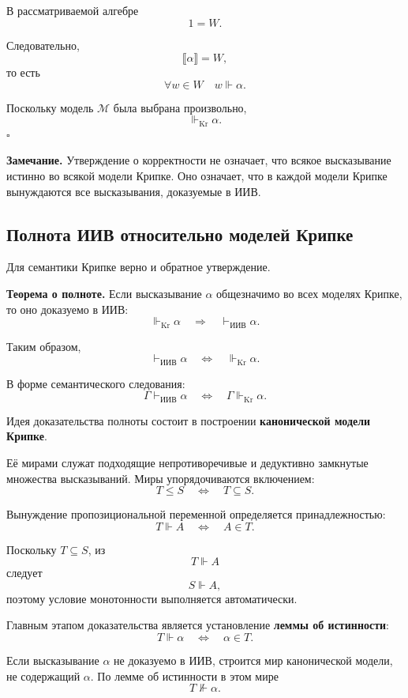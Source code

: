 \documentclass[12pt,a4paper,oneside,openany]{book}
\theoremstyle{definition}
\theoremstyle{plain}
\theoremstyle{remark}
\begin{document}
В рассматриваемой алгебре
\[
1=W.
\]

Следовательно,
\[
\llbracket\alpha\rrbracket=W,
\]
то есть
\[
\forall w\in W
\quad
w\Vdash\alpha.
\]

Поскольку модель \(\mathcal M\) была выбрана произвольно,
\[
\Vdash_{\mathrm{Kr}}\alpha.
\]
\hfill\(\square\)

\textbf{Замечание.}
Утверждение о корректности не означает, что всякое высказывание
истинно во всякой модели Крипке. Оно означает, что в каждой модели
Крипке вынуждаются все высказывания, доказуемые в ИИВ.

\subsection{Полнота ИИВ относительно моделей Крипке}

Для семантики Крипке верно и обратное утверждение.

\textbf{Теорема о полноте.}
Если высказывание \(\alpha\) общезначимо во всех моделях Крипке, то
оно доказуемо в ИИВ:
\[
\Vdash_{\mathrm{Kr}}\alpha
\quad\Longrightarrow\quad
\vdash_{\mathrm{ИИВ}}\alpha.
\]

Таким образом,
\[
\boxed{
\vdash_{\mathrm{ИИВ}}\alpha
\quad\Longleftrightarrow\quad
\Vdash_{\mathrm{Kr}}\alpha
}.
\]

В форме семантического следования:
\[
\boxed{
\Gamma\vdash_{\mathrm{ИИВ}}\alpha
\quad\Longleftrightarrow\quad
\Gamma\Vdash_{\mathrm{Kr}}\alpha
}.
\]

Идея доказательства полноты состоит в построении
\textbf{канонической модели Крипке}.

Её мирами служат подходящие непротиворечивые и дедуктивно замкнутые
множества высказываний. Миры упорядочиваются включением:
\[
T\leqslant S
\quad\Longleftrightarrow\quad
T\subseteq S.
\]

Вынуждение пропозициональной переменной определяется принадлежностью:
\[
T\Vdash A
\quad\Longleftrightarrow\quad
A\in T.
\]

Поскольку \(T\subseteq S\), из
\[
T\Vdash A
\]
следует
\[
S\Vdash A,
\]
поэтому условие монотонности выполняется автоматически.

Главным этапом доказательства является установление
\textbf{леммы об истинности}:
\[
T\Vdash\alpha
\quad\Longleftrightarrow\quad
\alpha\in T.
\]

Если высказывание \(\alpha\) не доказуемо в ИИВ, строится мир
канонической модели, не содержащий \(\alpha\). По лемме об истинности
в этом мире
\[
T\nVdash\alpha.
\]
\end{document}
